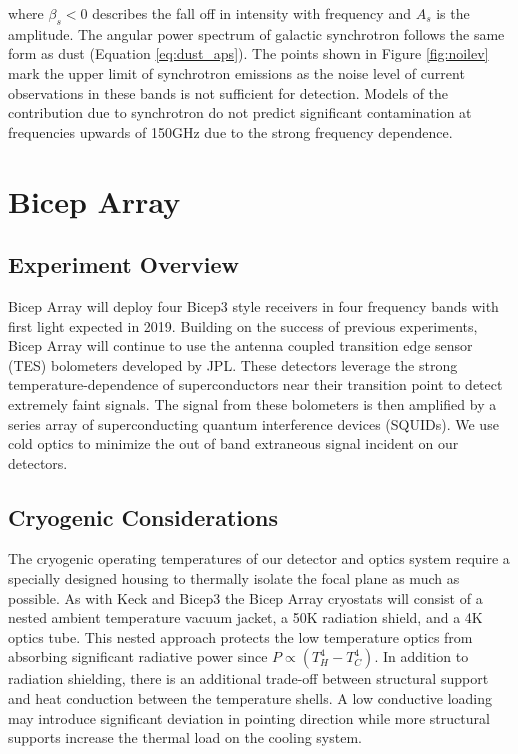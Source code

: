 \documentclass[12pt]{article}
\begin{document}
where $\beta _s < 0$ describes the fall off in intensity with frequency and
$A_s$ is the amplitude. The angular power spectrum of galactic synchrotron
follows the same form as dust (Equation \ref{eq:dust_aps}). The points shown
in Figure \ref{fig:noilev} mark the upper limit of synchrotron emissions as
the noise level of current observations in these bands is not sufficient for
detection. Models of the contribution due to synchrotron do not predict
significant contamination at frequencies upwards of 150GHz due to the strong
frequency dependence.


\section{Bicep Array}

\subsection{Experiment Overview}
Bicep Array will deploy four Bicep3 style receivers in four frequency bands
with first light expected in 2019. Building on the success of previous
experiments, Bicep Array will continue to use the antenna coupled transition
edge sensor (TES) bolometers developed by JPL. These detectors leverage the strong
temperature-dependence of superconductors near their transition point to
detect extremely faint signals. The signal from these bolometers is then
amplified by a series array of superconducting quantum interference devices
(SQUIDs). We use cold optics to minimize the out of band extraneous signal
incident on our detectors.

\subsection{Cryogenic Considerations}
The cryogenic operating temperatures of our detector and optics system require
a specially designed housing to thermally isolate the focal plane as much as
possible. As with Keck and Bicep3 the Bicep Array cryostats will consist of a
nested ambient temperature vacuum jacket, a 50K radiation shield, and a 4K
optics tube. This nested approach protects the low temperature optics
from absorbing significant radiative power since $P\propto (T_{H}^4-T_{C}^4)$.
In addition to radiation shielding, there is an additional trade-off between
structural support and heat conduction between the temperature shells. A low
conductive loading may introduce significant deviation in pointing direction
while more structural supports increase the thermal load on the cooling
system. 
\end{document}

